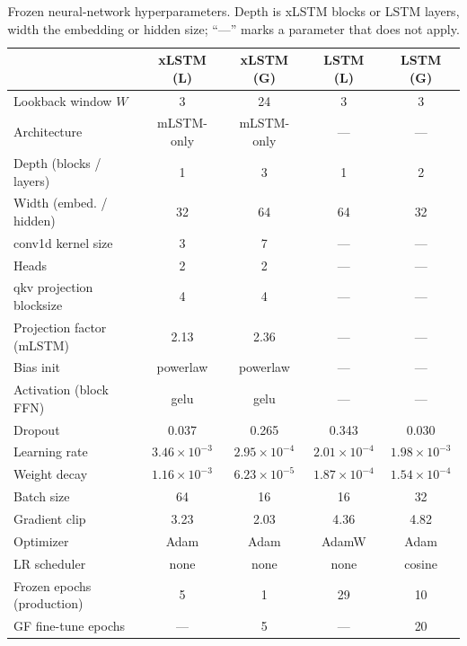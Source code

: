 \begin{table}[htbp]
  \centering\small
  \caption{Frozen neural-network hyperparameters. Depth is xLSTM blocks or LSTM layers, width the embedding or hidden size; ``---'' marks a parameter that does not apply.}
  \label{tab:app_frozen_nn}
  \begin{tabular}{@{}lcccc@{}}
    \toprule
    & \textbf{xLSTM (L)} & \textbf{xLSTM (G)} & \textbf{LSTM (L)} & \textbf{LSTM (G)} \\
    \midrule
    Lookback window $W$        & 3     & 24    & 3     & 3 \\
    Architecture               & mLSTM-only & mLSTM-only & --- & --- \\
    Depth (blocks / layers)    & 1     & 3     & 1     & 2 \\
    Width (embed. / hidden)    & 32    & 64    & 64    & 32 \\
    conv1d kernel size         & 3     & 7     & ---   & --- \\
    Heads                      & 2     & 2     & ---   & --- \\
    qkv projection blocksize   & 4     & 4     & ---   & --- \\
    Projection factor (mLSTM)  & 2.13  & 2.36  & ---   & --- \\
    Bias init                  & powerlaw & powerlaw & --- & --- \\
    Activation (block FFN)     & gelu  & gelu  & ---   & --- \\
    Dropout                    & 0.037 & 0.265 & 0.343 & 0.030 \\
    Learning rate              & $3.46\times10^{-3}$ & $2.95\times10^{-4}$ & $2.01\times10^{-4}$ & $1.98\times10^{-3}$ \\
    Weight decay               & $1.16\times10^{-3}$ & $6.23\times10^{-5}$ & $1.87\times10^{-4}$ & $1.54\times10^{-4}$ \\
    Batch size                 & 64    & 16    & 16    & 32 \\
    Gradient clip              & 3.23  & 2.03  & 4.36  & 4.82 \\
    Optimizer                  & Adam  & Adam  & AdamW & Adam \\
    LR scheduler               & none  & none  & none  & cosine \\
    Frozen epochs (production) & 5     & 1     & 29    & 10 \\
    GF fine-tune epochs        & ---   & 5     & ---   & 20 \\
    \bottomrule
  \end{tabular}
\end{table}


